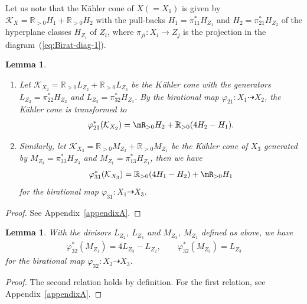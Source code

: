 \documentclass[pdftex]{sigma}
\numberwithin{equation}{section}
\newtheorem{Lemma}[Theorem]{Lemma}
\begin{document}
Let us note that the K\"ahler cone of $X(=X_{1})$ is given by $\mathcal{K}_{X}=\mathbb{R}_{>0}H_{1}+\mathbb{R}_{>0}H_{2}$ with the pull-backs $H_{1}=\pi_{11}^{*}H_{Z_{1}}$ and $H_{2}=\pi_{21}^{*}H_{Z_{2}}$ of the hyperplane classes $H_{Z_{i}}$ of $Z_{i}$, where $\pi_{ji}\colon X_{i}\to Z_{j}$ is the projection in the diagram~(\ref{eq:Birat-diag-1}).
\begin{Lemma}\label{lem:KahlerX2}\quad
\begin{enumerate}\itemsep=0pt

\item[$(1)$] Let $\mathcal{K}_{X_{2}}=\mathbb{R}_{>0}L_{Z_{2}}+\mathbb{R}_{>0}L_{Z_{3}}$
be the $K$\"ahler cone with the generators $L_{Z_{2}}=\pi_{22}^{*}H_{Z_{2}}$
and $L_{Z_{3}}=\pi_{32}^{*}H_{Z_{3}}$. By the birational map $\varphi_{21}\colon X_{1}\dashrightarrow X_{2}$,
the K\"ahler cone is transformed to
\begin{gather*}
\varphi_{21}^{*}(\mathcal{K}_{X_{2}})=\mR_{>0}H_{2}+\mathbb{R}_{>0}(4H_{2}-H_{1}).
\end{gather*}
\item[$(2)$] Similarly, let $\mathcal{K}_{X_{3}}=\mathbb{R}_{>0}M_{Z_{3}}+\mathbb{R}_{>0}M_{Z_{1}}$
be the K\"ahler cone of $X_{3}$ generated by $M_{Z_{3}}=\pi_{33}^{*}H_{Z_{3}}$
and $M_{Z_{1}}=\pi_{13}^{*}H_{Z_{1}}$, then we have
\begin{gather*}
\varphi_{31}^{*}(\mathcal{K}_{X_{3}})=\mathbb{R}_{>0}(4H_{1}-H_{2})+\mR_{>0}H_{1}
\end{gather*}
for the birational map $\varphi_{31}\colon X_{1}\dashrightarrow X_{3}$.
\end{enumerate}
\end{Lemma}
\begin{proof}
See Appendix~\ref{appendixA}. \end{proof}

\begin{Lemma}\label{lem:KahlerX3}With the divisors $L_{Z_{2}}$, $L_{Z_{3}}$ and $M_{Z_{3}}$, $M_{Z_{1}}$ defined as above, we have
\begin{gather*}
\varphi_{32}^{*}(M_{Z_{1}})=4L_{Z_{3}}-L_{Z_{2}},\qquad \varphi_{32}^{*}(M_{Z_{3}})=L_{Z_{3}}
\end{gather*}
for the birational map $\varphi_{32}\colon X_{2}\dashrightarrow X_{3}$.\end{Lemma}
\begin{proof} The second relation holds by definition. For the first relation, see Appendix~\ref{appendixA}.
\end{proof}
\end{document}
